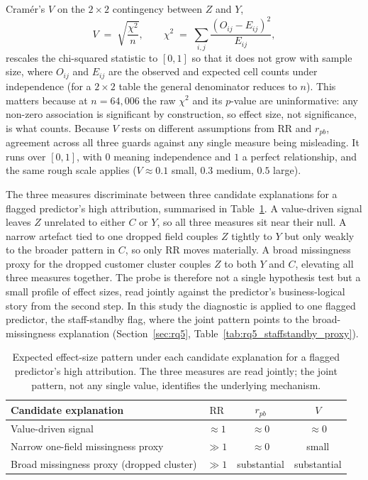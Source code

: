 \documentclass[oneside]{memoir} %
\begin{document}
Cram\'er's $V$ on the $2 \times 2$ contingency between $Z$ and $Y$,
\[
V \;=\; \sqrt{\frac{\chi^{2}}{n}}, \qquad \chi^{2} \;=\; \sum_{i,j} \frac{(O_{ij} - E_{ij})^{2}}{E_{ij}},
\]
rescales the chi-squared statistic to $[0, 1]$ so that it does not grow with sample size, where $O_{ij}$ and $E_{ij}$ are the observed and expected cell counts under independence (for a $2 \times 2$ table the general denominator reduces to $n$). This matters because at $n = 64{,}006$ the raw $\chi^{2}$ and its $p$-value are uninformative: any non-zero association is significant by construction, so effect size, not significance, is what counts. Because $V$ rests on different assumptions from $\mathrm{RR}$ and $r_{pb}$, agreement across all three guards against any single measure being misleading. It runs over $[0, 1]$, with $0$ meaning independence and $1$ a perfect relationship, and the same rough scale applies ($V \approx 0.1$ small, $0.3$ medium, $0.5$ large).

The three measures discriminate between three candidate explanations for a flagged predictor's high attribution, summarised in Table~\ref{tab:rq5_probe_pattern}. A value-driven signal leaves $Z$ unrelated to either $C$ or $Y$, so all three measures sit near their null. A narrow artefact tied to one dropped field couples $Z$ tightly to $Y$ but only weakly to the broader pattern in $C$, so only $\mathrm{RR}$ moves materially. A broad missingness proxy for the dropped customer cluster couples $Z$ to both $Y$ and $C$, elevating all three measures together. The probe is therefore not a single hypothesis test but a small profile of effect sizes, read jointly against the predictor's business-logical story from the second step. In this study the diagnostic is applied to one flagged predictor, the staff-standby flag, where the joint pattern points to the broad-missingness explanation (Section~\ref{sec:rq5}, Table~\ref{tab:rq5_staffstandby_proxy}).

\begin{table}[ht]
\caption{Expected effect-size pattern under each candidate explanation for a flagged predictor's high attribution. The three measures are read jointly; the joint pattern, not any single value, identifies the underlying mechanism.}
\label{tab:rq5_probe_pattern}
\centering
\begin{tabular}{lccc}
\toprule
Candidate explanation & $\mathrm{RR}$ & $r_{pb}$ & $V$ \\
\midrule
Value-driven signal & $\approx 1$ & $\approx 0$ & $\approx 0$ \\
Narrow one-field missingness proxy & $\gg 1$ & $\approx 0$ & small \\
Broad missingness proxy (dropped cluster) & $\gg 1$ & substantial & substantial \\
\bottomrule
\end{tabular}
\end{table}
\end{document}
